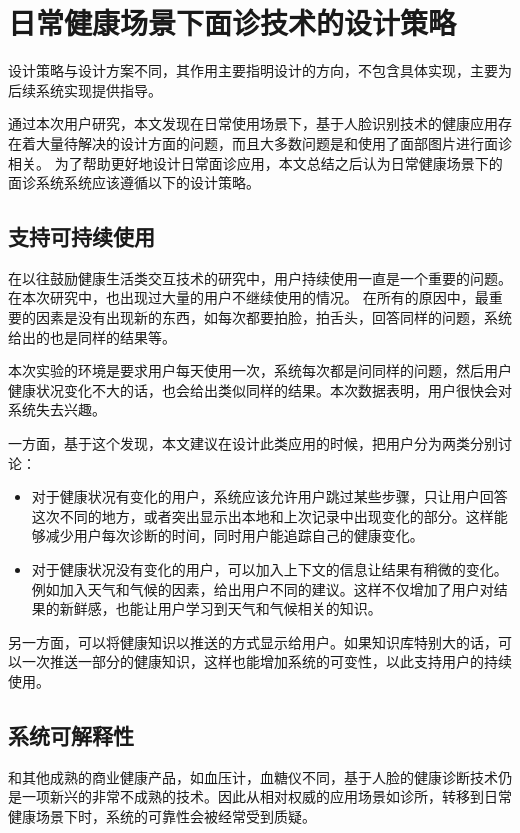 \section{日常健康场景下面诊技术的设计策略}
设计策略与设计方案不同，其作用主要指明设计的方向，不包含具体实现，主要为后续系统实现提供指导。

通过本次用户研究，本文发现在日常使用场景下，基于人脸识别技术的健康应用存在着大量待解决的设计方面的问题，而且大多数问题是和使用了面部图片进行面诊相关。
为了帮助更好地设计日常面诊应用，本文总结之后认为日常健康场景下的面诊系统系统应该遵循以下的设计策略。

\subsection{支持可持续使用}
在以往鼓励健康生活类交互技术的研究中，用户持续使用一直是一个重要的问题\cite{Clawson2015No,Epstein2016Beyond}。在本次研究中，也出现过大量的用户不继续使用的情况。
在所有的原因中，最重要的因素是没有出现新的东西，如每次都要拍脸，拍舌头，回答同样的问题，系统给出的也是同样的结果等。

本次实验的环境是要求用户每天使用一次，系统每次都是问同样的问题，然后用户健康状况变化不大的话，也会给出类似同样的结果。本次数据表明，用户很快会对系统失去兴趣。

一方面，基于这个发现，本文建议在设计此类应用的时候，把用户分为两类分别讨论：
\begin{itemize}

    \item 对于健康状况有变化的用户，系统应该允许用户跳过某些步骤，只让用户回答这次不同的地方，或者突出显示出本地和上次记录中出现变化的部分。这样能够减少用户每次诊断的时间，同时用户能追踪自己的健康变化。

    \item 对于健康状况没有变化的用户，可以加入上下文的信息让结果有稍微的变化。例如加入天气和气候的因素，给出用户不同的建议。这样不仅增加了用户对结果的新鲜感，也能让用户学习到天气和气候相关的知识。

\end{itemize}

另一方面，可以将健康知识以推送的方式显示给用户。如果知识库特别大的话，可以一次推送一部分的健康知识，这样也能增加系统的可变性，以此支持用户的持续使用。

\subsection{系统可解释性}

和其他成熟的商业健康产品，如血压计，血糖仪不同，基于人脸的健康诊断技术仍是一项新兴的非常不成熟的技术。因此从相对权威的应用场景如诊所，转移到日常健康场景下时，系统的可靠性会被经常受到质疑。

